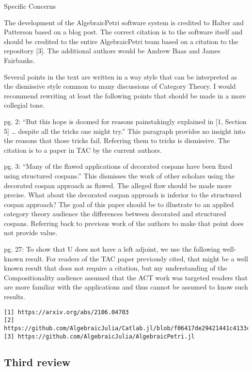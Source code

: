 \documentclass[reqno]{amsart}
\begin{document}
{Specific Concerns

The development of the AlgebraicPetri software system is credited to Halter and Patterson based on a blog post. The correct citation is to the 
software itself and should be credited to the entire AlgebraicPetri team based on a citation to the repository [3]. The additional authors would be 
Andrew Baas and James Fairbanks.

Several points in the text are written in a way style that can be interpreted as the dismissive style common to many discussions of Category Theory. I 
would recommend rewriting at least the following points that should be made in a more collegial tone.

pg. 2: “But this hope is doomed for reasons painstakingly explained in [1, Section 5] … despite all the tricks one might try.” This paragraph provides 
no insight into the reasons that those tricks fail. Referring them to tricks is dismissive. The citation is to a paper in TAC by the current authors.

pg. 3: “Many of the flawed applications of decorated cospans have been fixed using structured cospans.” This dismisses the work of other scholars 
using the decorated cospan approach as flawed. The alleged flaw should be made more precise. What about the decorated cospan approach is inferior to 
the structured cospan approach? The goal of this paper should be to illustrate to an applied category theory audience the differences between 
decorated and structured cospans. Referring back to previous work of the authors to make that point does not provide value.

pg. 27: To show that U does not have a left adjoint, we use the following well-known result. For readers of the TAC paper previously cited, that might 
be a well known result that does not require a citation, but my understanding of the Compositionality audience assumed that the ACT work was targeted 
readers that are more familiar with the applications and thus cannot be assumed to know such results.}

\begin{verbatim}
[1] https://arxiv.org/abs/2106.04703
[2] https://github.com/AlgebraicJulia/Catlab.jl/blob/f06417de29421441c4133c1cfb75b39ae8aa7142/src/categorical_algebra/StructuredCospans.jl
[3] https://github.com/AlgebraicJulia/AlgebraicPetri.jl
\end{verbatim}

\subsection{Third review}
\end{document}
